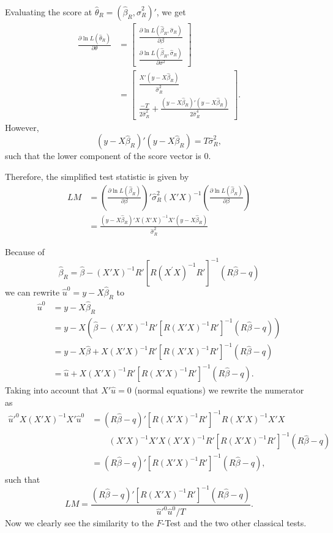 \documentclass{article}
\begin{document}
Evaluating the score at $\hat\theta_R=(\hat\beta_R,\hat\sigma^2_R)'$, we get
\begin{align*}
\frac{\partial\ln L(\hat\theta_R)}{\partial\theta}
&=\left[ \begin{array}{c}
\frac{\partial \ln L(\hat\beta_R,\hat\sigma_R)}{\partial \beta} \\[2ex] 
\frac{\partial \ln L(\hat\beta_R,\hat\sigma_R)}{\partial \sigma^2}
\end{array}\right] \\
&=\left[ \begin{array}{c}
\frac{X'(y-X\hat\beta_R)}{\hat\sigma_R^2} \\[2ex] 
\frac{-T}{2\hat\sigma_R^2}+\frac{(y-X\hat\beta_R)'(y-X\hat\beta_R)}{2\hat\sigma_R^4}\end{array}
\right].
\end{align*}
However,
\[ (y-X\hat\beta_R)'(y-X\hat\beta_R)=T\hat\sigma_R^2, \]
such that the lower component of the score vector is 0. 

Therefore, the simplified test statistic is given by
\begin{align*}
LM&=\left( \frac{\partial\ln L(\hat\beta_R)}{\partial\beta}\right)'
\hat\sigma_R^2(X'X)^{-1}
\left( \frac{\partial\ln L(\hat\beta_R)}{\partial\beta}\right) \\
&= \frac{(y-X\hat\beta_R)'X(X'X)^{-1}X'(y-X\hat\beta_R)}{\hat\sigma_R^2}
\end{align*}

Because of%
\[
\hat{\beta}_{R}=\hat{\beta}-(X'X)^{-1}R'[R(X^{\prime
}X)^{-1}R']^{-1}(R\hat{\beta}-q)
\]%
we can rewrite $\hat{u}^{0}=y-X\hat{\beta}_{R}$ to
\begin{align*}
\hat{u}^{0} &=y-X\hat{\beta}_{R} \\
&=y-X\left( \hat{\beta}-(X'X)^{-1}R'[R(X'X)^{-1}R']^{-1}(R\hat{\beta}-q)\right)  \\
&=y-X\hat{\beta}+X(X'X)^{-1}R'[R(X'X)^{-1}R']^{-1}(R\hat{\beta}-q) \\
&=\hat{u}+X(X'X)^{-1}R'[R(X'X)^{-1}R']^{-1}(R\hat{\beta}-q).
\end{align*}
Taking into account that $X'\hat{u}=0$ (normal equations) we rewrite the numerator as
\begin{align*}
\hat{u}'^0 X(X'X)^{-1}X'\hat{u}^0 &=(R\hat\beta-q)'[R(X'X)^{-1}R']^{-1}R(X'X)^{-1}X'X\\
&\qquad(X'X)^{-1}X'X(X'X)^{-1}R'[R(X'X)^{-1}R']^{-1}(R\hat\beta-q) \\
&=(R\hat\beta-q)'[R(X'X)^{-1}R']^{-1}(R\hat\beta-q),
\end{align*}
such that
\[ LM=\frac{(R\hat\beta-q)'[R(X'X)^{-1}R']^{-1}(R\hat{\beta}-q)}{\hat u'^0\hat u^0/T}. \]
Now we clearly see the similarity to the $F$-Test and the two other classical tests.
\end{document}
